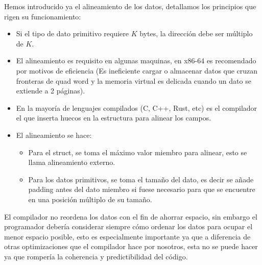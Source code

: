 Hemos introducido ya el alineamiento de los datos, detallamos los principios que rigen su funcionamiento:
\begin{itemize}
    \item Si el tipo de dato primitivo requiere $K$ bytes, la dirección debe ser múltiplo de $K$.
    \item El alineamiento es requisito en algunas maquinas, en x86-64 es recomendado por motivos de eficiencia (Es ineficiente cargar o almacenar datos que cruzan fronteras de quad word y
        la memoria virtual es delicada cuando un dato se extiende a 2 páginas).
    \item En la mayoría de lenguajes compilados (C, C++, Rust, etc) es el compilador el que inserta huecos en la estructura para alinear los campos.
    \item El alineamiento se hace:
        \begin{itemize}
            \item Para el struct, se toma el máximo valor miembro para alinear, esto se llama alineamiento externo.
            \item Para los datos primitivos, se toma el tamaño del dato, es decir se añade padding antes del dato miembro si fuese necesario para que se encuentre en una posición múltiplo de su tamaño.
        \end{itemize}
\end{itemize}
El compilador no reordena los datos con el fin de ahorrar espacio, sin embargo
el programador debería considerar siempre cómo ordenar los datos para ocupar el menor espacio posible, esto es 
especialmente importante ya que a diferencia de otras optimizaciones que el compilador hace por nosotros, esta no se puede hacer ya que rompería la coherencia y predictibilidad del código.
